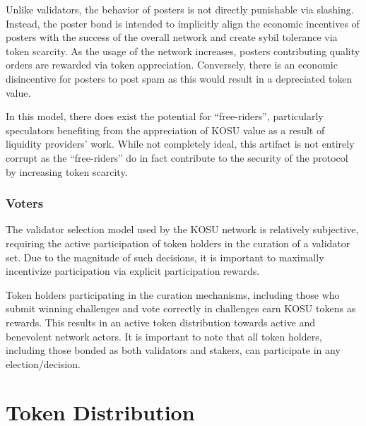 \documentclass[10pt]{article}
\begin{document}
Unlike validators, the behavior of posters is not directly punishable via slashing. Instead, the poster bond is intended to implicitly align the economic incentives of posters with the success of the overall network and create sybil tolerance via token scarcity. As the usage of the network increases, posters contributing quality orders are rewarded via token appreciation. Conversely, there is an economic disincentive for posters to post spam as this would result in a depreciated token value.
\medskip

In this model, there does exist the potential for “free-riders”, particularly speculators benefiting from the appreciation of KOSU value as a result of liquidity providers’ work. While not completely ideal, this artifact is not entirely corrupt as the “free-riders” do in fact contribute to the security of the protocol by increasing token scarcity. 

\subsubsection{Voters}\label{incentive-models-voters}
The validator selection model used by the KOSU network is relatively subjective, requiring the active participation of token holders in the curation of a validator set. Due to the magnitude of such decisions, it is important to maximally incentivize participation via explicit participation rewards. 
\medskip

Token holders participating in the curation mechanisms, including those who submit winning challenges and vote correctly in challenges earn KOSU tokens as rewards. This results in an active token distribution towards active and benevolent network actors. It is important to note that all token holders, including those bonded as both validators and stakers, can participate in any election/decision.

\clearpage
\pagebreak


\section{Token Distribution}\label{token-distribution}
\end{document}
